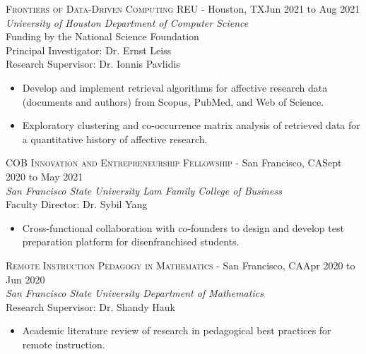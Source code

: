 \documentclass[hidelinks, 10pt]{article}
\begin{document}
{{\vspace{4mm}

\begin{minipage}[ct]{0.9\linewidth}
{\textsc{Frontiers of Data-Driven Computing REU} - Houston, TX}\hfill Jun 2021 to Aug 2021\\
\emph{University of Houston Department of Computer Science}\\
Funding by the National Science Foundation\\
Principal Investigator: Dr. Ernst Leiss\\
Research Supervisor: Dr. Ionnis Pavlidis
	\makeatletter
	\let\orig@listi\@listi
	\def\@listi{\orig@listi\topsep=0.25\baselineskip}
	\makeatother
    \begin{itemize}
    	\setlength\itemsep{-0.25em}
    	\item Develop and implement retrieval algorithms for affective research
    	data (documents and authors) from Scopus, PubMed, and Web of Science.
		\item Exploratory clustering and co-occurrence matrix analysis of
		retrieved data for a quantitative history of affective research.
    \end{itemize}
\end{minipage}

\vspace{4mm}

\begin{minipage}[ct]{0.9\linewidth}
{\textsc{COB Innovation and Entrepreneurship Fellowship} - San Francisco, CA}\hfill Sept 2020 to May 2021\\
\emph{San Francisco State University Lam Family College of Business}\\
Faculty Director: Dr. Sybil Yang
	\makeatletter
	\let\orig@listi\@listi
	\def\@listi{\orig@listi\topsep=0.25\baselineskip}
	\makeatother
    \begin{itemize}
    	\setlength\itemsep{-0.25em}
    	\item Cross-functional collaboration with co-founders to design and develop test preparation platform for disenfranchised students.
    \end{itemize}
\end{minipage}

\vspace{4mm}

\begin{minipage}[ct]{0.9\linewidth}
{\textsc{Remote Instruction Pedagogy in Mathematics} - San Francisco, CA}\hfill Apr 2020 to Jun 2020\\
\emph{San Francisco State University Department of Mathematics}\\
Research Supervisor: Dr. Shandy Hauk
	\makeatletter
	\let\orig@listi\@listi
	\def\@listi{\orig@listi\topsep=0.25\baselineskip}
	\makeatother
    \begin{itemize}
    	\setlength\itemsep{-0.25em}
    	\item Academic literature review of research in pedagogical best practices for remote instruction.
    \end{itemize}
\end{minipage}

}}
\end{document}
